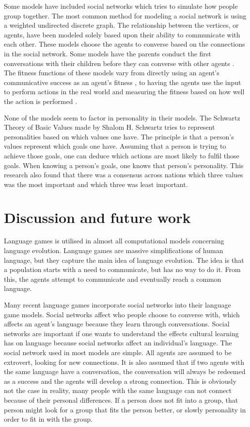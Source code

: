 Some models have included social networks which tries to simulate how people group together. The most common method for modeling a social network is using a weighted undirected discrete graph. The relationship between the vertices, or agents, have been modeled solely based upon their ability to communicate with each other. These models choose the agents to converse based on the connections in the social network. Some models have the parents conduct the first conversations with their children before they can converse with other agents \citet{lipowska2011naming, munroe2002learning}. The fitness functions of these models vary from directly using an agent's communicative success as an agent's fitness \citet{lekvam2014co, lipowska2011naming}, to having the agents use the input to perform actions in the real world and measuring the fitness based on how well the action is performed \cite{munroe2002learning}. 

None of the models seem to factor in personality in their models. The Schwartz Theory of Basic Values made by Shalom H. Schwartz tries to represent personalities based on which values one have. The principle is that a person’s values  represent which goals one have. Assuming that a person is trying to achieve those goals, one can deduce which actions are most likely to fulfil those goals. When knowing a person’s goals, one knows that person’s personality. This research also found that there was a consensus across nations which three values was the most important and which three was least important.

\section{Discussion and future work}
Language games is utilised in almost all computational models concerning language evolution. Language games are massive simplifications of human language, but they capture the main idea of language evolution. The idea is that a population starts with a need to communicate, but has no way to do it. From this, the agents attempt to communicate and eventually reach a common language. 

Many recent language games incorporate social networks into their language game models. Social networks affect who people choose to converse with, which affects an agent’s language because they learn through conversations. Social networks are important if one wants to understand the effects cultural learning has on language because social networks affect an individual’s language. The social network used in most models are simple. All agents are assumed to be extrovert, looking for new connections. It is also assumed that if two agents with the same language have a conversation, the conversation will always be redeemed as a success and the agents will develop a strong connection. This is obviously not the case in reality, many people with the same language can not connect because of their personal differences. If a person does not fit into a group, that person might look for a group that fits the person better, or slowly personality in order to fit in with the group. 

